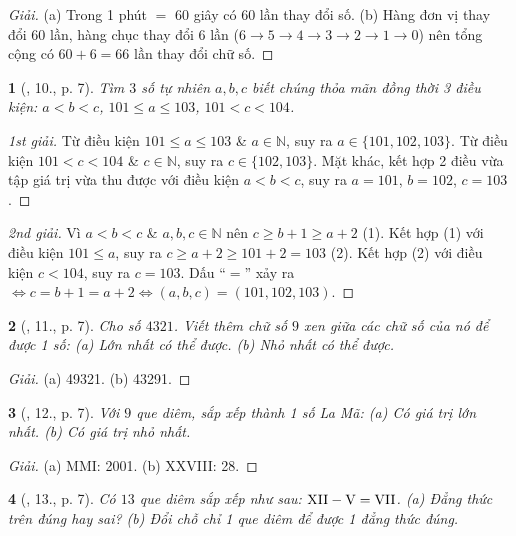 \documentclass{article}
\newtheorem{baitoan}{}
\begin{document}
\begin{proof}[Giải]
	(a) Trong 1 phút $=$ 60 giây có 60 lần thay đổi số. (b) Hàng đơn vị thay đổi 60 lần, hàng chục thay đổi 6 lần ($6\to5\to4\to3\to2\to1\to0$) nên tổng cộng có $60 + 6 = 66$ lần thay đổi chữ số.
\end{proof}

\begin{baitoan}[\cite{Tuyen_Toan_6}, 10., p. 7]
	Tìm $3$ số tự nhiên $a,b,c$ biết chúng thỏa mãn đồng thời 3 điều kiện: $a < b < c$, $101\le a\le103$, $101 < c < 104$.
\end{baitoan}

\begin{proof}[1st giải]
	Từ điều kiện $101\le a\le103$ \& $a\in\mathbb{N}$, suy ra $a\in\{101,102,103\}$. Từ điều kiện $101 < c < 104$ \& $c\in\mathbb{N}$, suy ra $c\in\{102,103\}$. Mặt khác, kết hợp 2 điều vừa tập giá trị vừa thu được với điều kiện $a < b < c$, suy ra $a = 101$, $b = 102$, $c = 103$.
\end{proof}

\begin{proof}[2nd giải]
	Vì $a < b < c$ \& $a,b,c\in\mathbb{N}$ nên $c\ge b + 1\ge a + 2$ (1). Kết hợp (1) với điều kiện $101\le a$, suy ra $c\ge a + 2\ge101 + 2 = 103$ (2). Kết hợp (2) với điều kiện $c < 104$, suy ra $c = 103$. Dấu ``$=$'' xảy ra $\Leftrightarrow c = b + 1 = a + 2\Leftrightarrow(a,b,c) = (101,102,103)$.
\end{proof}

\begin{baitoan}[\cite{Tuyen_Toan_6}, 11., p. 7]
	Cho số $4321$. Viết thêm chữ số $9$ xen giữa các chữ số của nó để được 1 số: (a) Lớn nhất có thể được. (b) Nhỏ nhất có thể được.
\end{baitoan}

\begin{proof}[Giải]
	(a) 49321. (b) 43291.
\end{proof}

\begin{baitoan}[\cite{Tuyen_Toan_6}, 12., p. 7]
	Với $9$ que diêm, sắp xếp thành 1 số La Mã: (a) Có giá trị lớn nhất. (b) Có giá trị nhỏ nhất.
\end{baitoan}

\begin{proof}[Giải]
	(a) MMI: 2001. (b) XXVIII: 28.
\end{proof}

\begin{baitoan}[\cite{Tuyen_Toan_6}, 13., p. 7]
	Có $13$ que diêm sắp xếp như sau: $\rm XII - V = VII$. (a) Đẳng thức trên đúng hay sai? (b) Đổi chỗ chỉ 1 que diêm để được 1 đẳng thức đúng.
\end{baitoan}
\end{document}
